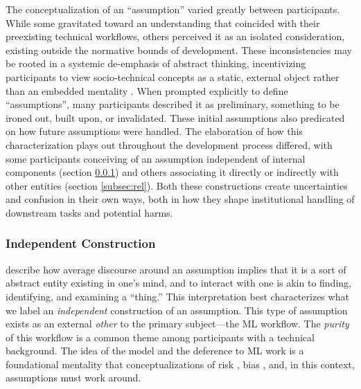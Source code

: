 The conceptualization of an ``assumption'' varied greatly between participants. While some gravitated toward an understanding that coincided with their preexisting technical workflows, others perceived it as an isolated consideration, existing outside the normative bounds of development. These inconsistencies may be rooted in a systemic de-emphasis of abstract thinking, incentivizing participants to view socio-technical concepts as a static, external object rather than an embedded mentality \cite{selbst2019fairness,wang2022towards,malik2020hierarchy,fazelpour2020algorithmic}. When prompted explicitly to define ``assumptions'', many participants described it as preliminary, something to be ironed out, built upon, or invalidated. These initial assumptions also predicated on how future assumptions were handled. The elaboration of how this characterization plays out throughout the development process differed, with some participants conceiving of an assumption independent of internal components (section \ref{subsec:ind}) and others associating it directly or indirectly with other entities (section \ref{subsec:rel}). Both these constructions create uncertainties and confusion in their own ways, both in how they shape institutional handling of downstream tasks and potential harms. 
% 

\subsubsection{Independent Construction}
\label{subsec:ind}
\citet{delin1994assumption} describe how average discourse around an assumption implies that it is a sort of abstract entity existing in one's mind, and to interact with one is akin to finding, identifying, and examining a ``thing.'' This interpretation best characterizes what we label an \textit{independent} construction of an assumption. This type of assumption exists as an external \textit{other} to the primary subject---the ML workflow. The \textit{purity} of this workflow is a common theme among participants with a technical background. The idea of the model and the deference to ML work is a foundational mentality that conceptualizations of risk \cite{saxenaRethinkingRiskAlgorithmic2023,zanotti2024ai}, bias \cite{andrusWhatWeCan2021,kernAssumptionsBiasData}, and, in this context, assumptions must work around. 

